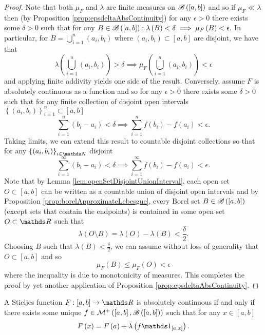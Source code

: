 \begin{proof}
Note that both $\mu_{F}$ and $\lambda$ are finite measures on $\mathscr{B}\left(\left[a,b\right]\right)$
and so if $\mu_{F}\ll\lambda$ then (by Proposition \ref{prop:epsdeltaAbsContinuity})
for any $\epsilon>0$ there exists some $\delta>0$ such that for
any $B\in\mathscr{B}\left(\left[a,b\right]\right):\lambda\left(B\right)<\delta\implies\mu_{F}\left(B\right)<\epsilon.$
In particular, for $B=\bigcup_{i=1}^{n}\left(a_{i},b_{i}\right)$
where $\left(a_{i},b_{i}\right)\subset\left[a,b\right]$ are disjoint,
we have that 
\[
\lambda\left(\bigcup_{i=1}^{n}\left(a_{i},b_{i}\right)\right)>\delta\implies\mu_{F}\left(\bigcup_{i=1}^{n}\left(a_{i},b_{i}\right)\right)<\epsilon
\]
and applying finite addivity yields one side of the result. Conversely,
assume $F$ is absolutely continuous as a function and so for any
$\epsilon>0$ there exists some $\delta>0$ such that for any finite
collection of disjoint open intervals $\left\{ \left(a_{i},b_{i}\right)\right\} _{i=1}^{n}\subset\left[a,b\right]$
\[
\sum_{i=1}^{n}\left(b_{i}-a_{i}\right)<\delta\implies\sum_{i=1}^{n}f\left(b_{i}\right)-f\left(a_{i}\right)<\epsilon.
\]
Taking limits, we can extend this result to countable disjoint collections
so that for any $\left\{ \left(a_{i},b_{i}\right)\right\} _{i\in\N}$
disjoint
\[
\sum_{i=1}^{\infty}\left(b_{i}-a_{i}\right)<\delta\implies\sum_{i=1}^{\infty}f\left(b_{i}\right)-f\left(a_{i}\right)<\epsilon.
\]
 Note that by Lemma \ref{lem:openSetDisjointUnionInterval}, each
open set $O\subset\left[a,b\right]$ can be written as a countable
union of disjoint open intervals and by Proposition \ref{prop:borelApproximateLebesgue},
every Borel set $B\in\mathscr{B}\left(\left[a,b\right]\right)$ (except
sets that contain the endpoints) is contained in some open set $O\subset\R$
such that 
\[
\lambda\left(O\setminus B\right)=\lambda\left(O\right)-\lambda\left(B\right)<\frac{\delta}{2}.
\]
Choosing $B$ such that $\lambda\left(B\right)<\frac{\delta}{2}$,
we can assume without loss of generality that $O\subset\left[a,b\right]$
and so 
\[
\mu_{F}\left(B\right)\leq\mu_{F}\left(O\right)<\epsilon
\]
where the inequality is due to monotonicity of measures. This completes
the proof by yet another application of Proposition \ref{prop:epsdeltaAbsContinuity}.
\end{proof}
\begin{cor}
\label{cor:stieljesAbsContRepresentation}A Stieljes function $F:\left[a,b\right]\to\R$
is absolutely continuous if and only if there exists some unique $f\in\mathcal{M}^{+}\left(\left[a,b\right],\mathscr{B}\left(\left[a,b\right]\right)\right)$
such that for any $x\in\left[a,b\right]$
\[
F\left(x\right)=F\left(a\right)+\lebInt{\lambda}{f\indicate_{\left[a,x\right]}}.
\]
\end{cor}

